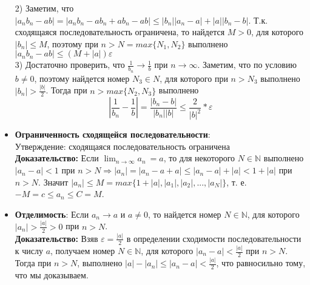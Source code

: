 \documentclass[12pt,a4paper]{article}
\begin{document}
\begin{itemize}
    2) Заметим, что $|a_n b_n - a b| = |a_n b_n - a b_n + a b_n - a b| \leq |b_n| |a_n - a| + |a| |b_n - b|$. Т.к. сходящаяся последовательность ограничена, то найдется $M > 0$, для которого $|b_n| \leq M$, поэтому при  $n > N = max\{ N_1, N_2\}$ выполнено $|a_n b_n - a b| \leq (M + |a|)\varepsilon$\\
    3) Достаточно проверить, что $\frac{1}{b_n} \to \frac{1}{b}$ при $n \to \infty$. Заметим, что по условию $b \neq 0$, поэтому найдется номер $N_3 \in N$, для которого при $n > N_3$ выполнено $|b_n| > \frac{|b|}{2}$. Тогда при $n > max \{N_2, N_3\}$ выполнено \[|\frac{1}{b_n} - \frac{1}{b}| = \frac{|b_n - b|}{|b_n| |b|} \leq \frac{2}{|b|^2} * \varepsilon\]
    \item \textbf{Ограниченность сходящейся последовательности}:\\
    Утверждение: сходящаяся последовательность ограничена\\
    \textbf{Доказательство:} Если $\lim_{n \to \infty} a_n\ = a$, то для некоторого $N \in \mathbb{N}$ выполнено  
    $|a_n - a| < 1$ при $n > N  \Rightarrow |a_n| = |a_n - a + a| \leq |a_n - a| + |a| < 1 + |a|$ при $n > N$.
    Значит $|a_n| \leq M = max\{1 + |a|, |a_1|, |a_2|, ..., |a_N|\}$, т. е. $-M = c \leq a_n \leq C = M$.
    
    \item \textbf{Отделимость}:
    Если $a_n \to a$ и $a \neq 0$, то найдется номер $N \in \mathbb{N}$, для которого $|a_n| > \frac{|a|}{2} > 0$ при $n > N$.\\
    \textbf{Доказательство:} Взяв $\varepsilon = \frac{|a|}{2}$ в определении сходимости последовательности к числу $a$, получаем номер $N \in \mathbb{N}$, для которого $|a_n - a| < \frac{|a|}{2}$ при $n > N$. Тогда при $n > N$, выполнено $|a| - |a_n| \leq |a_n - a| < \frac{|a|}{2}$, что равносильно тому, что мы доказываем.
  
\end{itemize}
\end{document}
